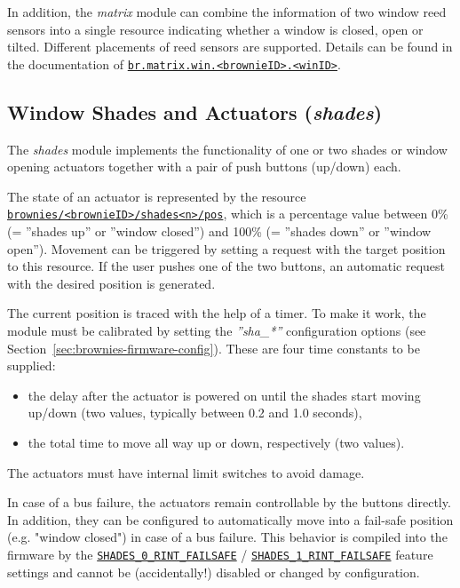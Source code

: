 \documentclass[12pt,english,parskip=half,headheight=19pt]{scrreprt}
\newcommand{\idx}[1]{#1\index{#1}}
\newcommand{\refenv}[1]{\hyperref[env:#1]{\texttt{#1}}}        %
\newcommand{\refrc}[1]{\hyperref[rc:#1]{\texttt{#1}}}
\newcommand{\refapic}[1]{\href{home2l-api_c/index.html}{\mbox{\texttt{#1}}}}            %
\begin{document}
In addition, the \textit{matrix} module can combine the information of two window reed sensors into a single resource indicating whether a window is closed, open or tilted. Different placements of reed sensors are supported. Details can be found in the documentation of \refenv{br.matrix.win.<brownieID>.<winID>}.



\subsection{Window Shades and Actuators (\textit{shades})}
\label{sec:brownies-features-shades}

The \textit{shades} module implements the functionality of one or two shades or window opening actuators together with a pair of push buttons (up/down) each.

The state of an actuator is represented by the resource \refrc{brownies/<brownieID>/shades<n>/pos}, which is a percentage value between 0\% (= ''shades up'' or ''window closed'') and 100\% (= ''shades down'' or ''window open''). Movement can be triggered by setting a request with the target position to this resource. If the user pushes one of the two buttons, an automatic request with the desired position is generated.

The current position is traced with the help of a timer. To make it work, the module must be calibrated by setting the \textit{''sha\_*''} configuration options (see Section~\ref{sec:brownies-firmware-config}). These are four time constants to be supplied:
\begin{itemize}
  \item the delay after the actuator is powered on until the shades start moving up/down 
        (two values, typically between 0.2 and 1.0 seconds),
  \item the total time to move all way up or down, respectively (two values).
\end{itemize}

The actuators must have internal limit switches to avoid damage.

In case of a bus failure, the actuators remain controllable by the buttons directly. In addition, they can be configured to automatically move into a fail-safe position (e.g. "window closed") in case of a bus failure. This behavior is compiled into the firmware by the \refapic{SHADES\_0\_RINT\_FAILSAFE} / \refapic{SHADES\_1\_RINT\_FAILSAFE} feature settings and cannot be (accidentally!) disabled or changed by configuration.
\end{document}
